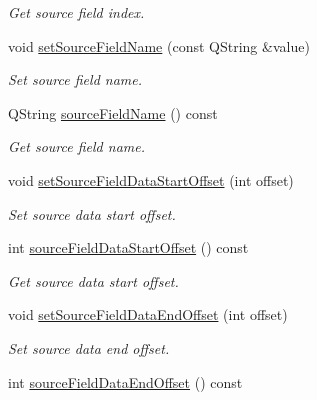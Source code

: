 \begin{DoxyCompactItemize}
\begin{DoxyCompactList}\small\item\em Get source field index. \end{DoxyCompactList}\item 
\hypertarget{classmdt_field_map_item_a5cd708ef0209f51503b110883b564415}{
void \hyperlink{classmdt_field_map_item_a5cd708ef0209f51503b110883b564415}{setSourceFieldName} (const QString \&value)}
\label{classmdt_field_map_item_a5cd708ef0209f51503b110883b564415}

\begin{DoxyCompactList}\small\item\em Set source field name. \end{DoxyCompactList}\item 
\hypertarget{classmdt_field_map_item_a6b9da63e50d0b174879a74ea235cea55}{
QString \hyperlink{classmdt_field_map_item_a6b9da63e50d0b174879a74ea235cea55}{sourceFieldName} () const }
\label{classmdt_field_map_item_a6b9da63e50d0b174879a74ea235cea55}

\begin{DoxyCompactList}\small\item\em Get source field name. \end{DoxyCompactList}\item 
void \hyperlink{classmdt_field_map_item_ac23aca5ff0d06f77e63206cd5519311b}{setSourceFieldDataStartOffset} (int offset)
\begin{DoxyCompactList}\small\item\em Set source data start offset. \end{DoxyCompactList}\item 
\hypertarget{classmdt_field_map_item_a03e8193593c5296056896cacc1511b35}{
int \hyperlink{classmdt_field_map_item_a03e8193593c5296056896cacc1511b35}{sourceFieldDataStartOffset} () const }
\label{classmdt_field_map_item_a03e8193593c5296056896cacc1511b35}

\begin{DoxyCompactList}\small\item\em Get source data start offset. \end{DoxyCompactList}\item 
void \hyperlink{classmdt_field_map_item_a1f3ce5708a258078d8a8ced713bc99f8}{setSourceFieldDataEndOffset} (int offset)
\begin{DoxyCompactList}\small\item\em Set source data end offset. \end{DoxyCompactList}\item 
\hypertarget{classmdt_field_map_item_a71d1c69b8bc027f0af52275e5ad16248}{
int \hyperlink{classmdt_field_map_item_a71d1c69b8bc027f0af52275e5ad16248}{sourceFieldDataEndOffset} () const }
\label{classmdt_field_map_item_a71d1c69b8bc027f0af52275e5ad16248}


\end{DoxyCompactItemize}

